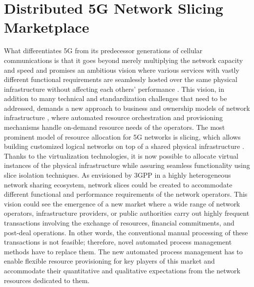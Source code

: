 \section{Distributed \ac{5G} Network Slicing Marketplace}
\label{BC:sec:slicing}


What differentiates 5G from its predecessor generations of cellular communications is that it goes beyond merely multiplying the network capacity and speed and promises an ambitious vision where various services with vastly different functional requirements are seamlessly hosted over the same physical infrastructure without affecting each others' performance \cite{7980666}. This vision, in addition to many technical and standardization challenges that need to be addressed, demands a new approach to business and ownership models of network infrastructure \cite{Nima-5g-evol}, where automated resource orchestration and provisioning mechanisms handle on-demand resource needs of the operators. 
The most prominent model of resource allocation for 5G networks is slicing, which allows building customized logical networks on top of a shared physical infrastructure \cite{FCC_slicing}. Thanks to the virtualization technologies, it is now possible to allocate virtual instances of the physical infrastructure while assuring seamless functionality using slice isolation techniques.
As envisioned by \ac{3GPP} \cite{3gpp_tr_2018} in a highly heterogeneous network sharing ecosystem, network slices could be created to accommodate different functional and performance requirements of the network operators. This vision could see the emergence of a new market where a wide range of network operators, infrastructure providers, or public authorities carry out highly frequent transactions involving the exchange of resources, financial commitments, and post-deal operations. In other words, the conventional manual processing of these transactions is not feasible; therefore, novel automated process management methods have to replace them.
The new automated process management has to enable flexible resource provisioning for key players of this market and accommodate their quantitative and qualitative expectations from the network resources dedicated to them.


